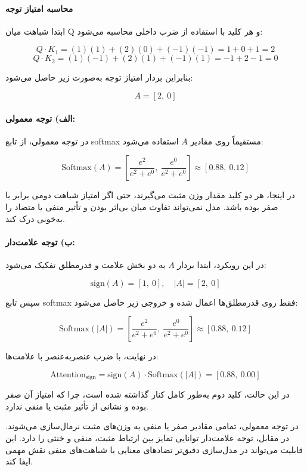 \paragraph{محاسبه امتیاز توجه}

ابتدا شباهت میان Q و هر کلید با استفاده از ضرب داخلی محاسبه می‌شود:

\[
Q \cdot K_1 = (1)(1) + (2)(0) + (-1)(-1) = 1 + 0 + 1 = 2
\]
\[
Q \cdot K_2 = (1)(-1) + (2)(1) + (-1)(1) = -1 + 2 -1 = 0
\]

بنابراین بردار امتیاز توجه به‌صورت زیر حاصل می‌شود:

\[
A = [2,\ 0]
\]

\paragraph{الف) توجه معمولی:}

در توجه معمولی، از تابع softmax مستقیماً روی مقادیر $A$ استفاده می‌شود:

\[
\text{Softmax}(A) =
\left[
\frac{e^2}{e^2 + e^0},\ 
\frac{e^0}{e^2 + e^0}
\right]
\approx [0.88,\ 0.12]
\]

در اینجا، هر دو کلید مقدار وزن مثبت می‌گیرند، حتی اگر امتیاز شباهت دومی برابر با صفر بوده باشد. مدل نمی‌تواند تفاوت میان بی‌اثر بودن و تأثیر منفی یا متضاد را به‌خوبی درک کند.

\paragraph{ب) توجه علامت‌دار:}

در این رویکرد، ابتدا بردار $A$ به دو بخش علامت و قدرمطلق تفکیک می‌شود:

\[
\text{sign}(A) = [1,\ 0], \quad
|A| = [2,\ 0]
\]

سپس تابع softmax فقط روی قدرمطلق‌ها اعمال شده و خروجی زیر حاصل می‌شود:

\[
\text{Softmax}(|A|) = 
\left[
\frac{e^2}{e^2 + e^0},\ 
\frac{e^0}{e^2 + e^0}
\right]
\approx [0.88,\ 0.12]
\]

در نهایت، با ضرب عنصر‌به‌عنصر با علامت‌ها:

\[
\text{Attention}_{\text{sign}} = 
\text{sign}(A) \cdot \text{Softmax}(|A|) = [0.88,\ 0.00]
\]

در این حالت، کلید دوم به‌طور کامل کنار گذاشته شده است، چرا که امتیاز آن صفر بوده و نشانی از تأثیر مثبت یا منفی ندارد.


در توجه معمولی، تمامی مقادیر صفر یا منفی به وزن‌های مثبت نرمال‌سازی می‌شوند. در مقابل، توجه علامت‌دار توانایی تمایز بین ارتباط مثبت، منفی و خنثی را دارد. این قابلیت می‌تواند در مدل‌سازی دقیق‌تر تضادهای معنایی یا شباهت‌های منفی نقش مهمی ایفا کند.


